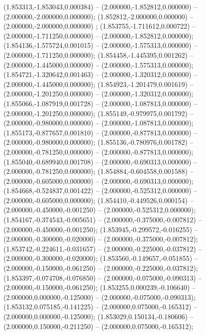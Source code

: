  (1.853313,-1.853043,0.000384) -- (2.000000,-1.852812,0.000000) -- (2.000000,-2.000000,0.000000);
 (1.852812,-2.000000,0.000000) -- (2.000000,-2.000000,0.000000) ;
 (1.853755,-1.711612,0.000722) -- (2.000000,-1.711250,0.000000) -- (2.000000,-1.852812,0.000000);
 (1.854136,-1.575724,0.001015) -- (2.000000,-1.575313,0.000000) -- (2.000000,-1.711250,0.000000);
 (1.854458,-1.445395,0.001262) -- (2.000000,-1.445000,0.000000) -- (2.000000,-1.575313,0.000000);
 (1.854721,-1.320642,0.001463) -- (2.000000,-1.320312,0.000000) -- (2.000000,-1.445000,0.000000);
 (1.854923,-1.201479,0.001619) -- (2.000000,-1.201250,0.000000) -- (2.000000,-1.320312,0.000000);
 (1.855066,-1.087919,0.001728) -- (2.000000,-1.087813,0.000000) -- (2.000000,-1.201250,0.000000);
 (1.855149,-0.979975,0.001792) -- (2.000000,-0.980000,0.000000) -- (2.000000,-1.087813,0.000000);
 (1.855173,-0.877657,0.001810) -- (2.000000,-0.877813,0.000000) -- (2.000000,-0.980000,0.000000);
 (1.855136,-0.780976,0.001782) -- (2.000000,-0.781250,0.000000) -- (2.000000,-0.877813,0.000000);
 (1.855040,-0.689940,0.001708) -- (2.000000,-0.690313,0.000000) -- (2.000000,-0.781250,0.000000);
 (1.854884,-0.604558,0.001588) -- (2.000000,-0.605000,0.000000) -- (2.000000,-0.690313,0.000000);
 (1.854668,-0.524837,0.001422) -- (2.000000,-0.525312,0.000000) -- (2.000000,-0.605000,0.000000);
 (1.854410,-0.449526,0.000154) -- (2.000000,-0.450000,-0.001250) -- (2.000000,-0.525312,0.000000);
 (1.854167,-0.374543,-0.005651) -- (2.000000,-0.375000,-0.007812) -- (2.000000,-0.450000,-0.001250);
 (1.853945,-0.299572,-0.016255) -- (2.000000,-0.300000,-0.020000) -- (2.000000,-0.375000,-0.007812);
 (1.853742,-0.224611,-0.031657) -- (2.000000,-0.225000,-0.037812) -- (2.000000,-0.300000,-0.020000);
 (1.853560,-0.149657,-0.051855) -- (2.000000,-0.150000,-0.061250) -- (2.000000,-0.225000,-0.037812);
 (1.853397,-0.074708,-0.076850) -- (2.000000,-0.075000,-0.090313) -- (2.000000,-0.150000,-0.061250);
 (1.853255,0.000239,-0.106640) -- (2.000000,0.000000,-0.125000) -- (2.000000,-0.075000,-0.090313);
 (1.853132,0.075185,-0.141225) -- (2.000000,0.075000,-0.165312) -- (2.000000,0.000000,-0.125000);
 (1.853029,0.150134,-0.180606) -- (2.000000,0.150000,-0.211250) -- (2.000000,0.075000,-0.165312);
